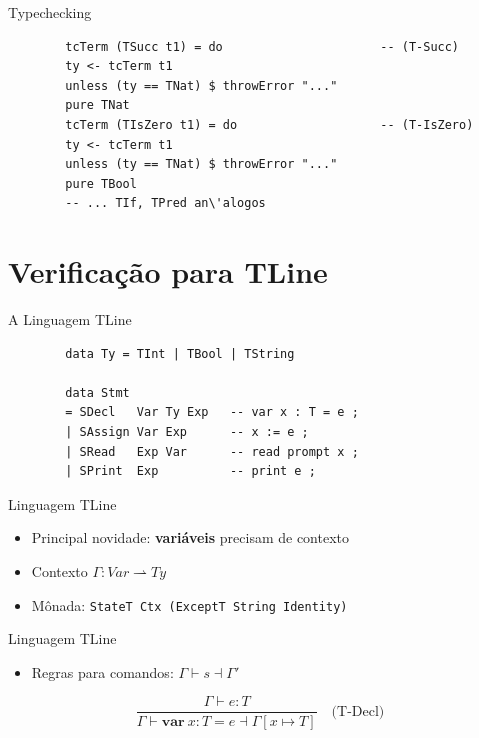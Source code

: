 \begin{frame}[fragile]{Typechecking}

    \begin{lstlisting}
        tcTerm (TSucc t1) = do                      -- (T-Succ)
        ty <- tcTerm t1
        unless (ty == TNat) $ throwError "..."
        pure TNat
        tcTerm (TIsZero t1) = do                    -- (T-IsZero)
        ty <- tcTerm t1
        unless (ty == TNat) $ throwError "..."
        pure TBool
        -- ... TIf, TPred an\'alogos
    \end{lstlisting}
\end{frame}


\section{Verificação para TLine}\label{verificauxe7uxe3o-para-tline}

\begin{frame}[fragile]{A Linguagem TLine}

    \begin{lstlisting}
        data Ty = TInt | TBool | TString

        data Stmt
        = SDecl   Var Ty Exp   -- var x : T = e ;
        | SAssign Var Exp      -- x := e ;
        | SRead   Exp Var      -- read prompt x ;
        | SPrint  Exp          -- print e ;
    \end{lstlisting}
\end{frame}

\begin{frame}[fragile]{Linguagem TLine}

    \begin{itemize}

        \item
        Principal novidade: \textbf{variáveis} precisam de contexto
        \item
        Contexto \(\Gamma : \mathit{Var} \rightharpoonup \mathit{Ty}\)
        \item
        Mônada: \texttt{StateT Ctx (ExceptT String Identity)}
    \end{itemize}
\end{frame}

\begin{frame}{Linguagem TLine}

    \begin{itemize}

        \item
        Regras para comandos: \(\Gamma \vdash s \dashv \Gamma'\)
    \end{itemize}

    \[\frac{\Gamma \vdash e : T}{\Gamma \vdash \mathbf{var}\ x : T = e \dashv \Gamma[x \mapsto T]} \quad\text{(T-Decl)}\]
\end{frame}

